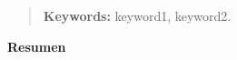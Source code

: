 \begin{quotation}




{\bf Keywords:} keyword1, keyword2.
\end{quotation}


\newpage

\vspace*{2cm}
\pagestyle{empty}
{\bfseries \Huge Resumen }
\vspace{1.5cm}

